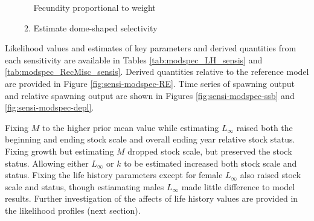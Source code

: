 \documentclass[11pt,
  english,
  a4paper,
]{article}
\begin{document}
\begin{itemize}
\begin{enumerate}

    Fecundity proportional to weight

    \tagmcend\tagstructend\tagstructend

    \tagmcend\tagstructend\tagstructend
  \item


    Estimate dome-shaped selectivity

    \tagmcend\tagstructend\tagstructend

    \tagmcend\tagstructend\tagstructend
  \end{enumerate}

  \tagstructend
\end{itemize}

\tagstructend


Likelihood values and estimates of key parameters and derived quantities from each sensitivity are available in Tables \ref{tab:modspec_LH_sensis} and \ref{tab:modspec_RecMisc_sensis}. Derived quantities relative to the reference model are provided in Figure \ref{fig:sensi-modspec-RE}. Time series of spawning output and relative spawning output are shown in Figures \ref{fig:sensi-modspec-ssb} and \ref{fig:sensi-modspec-depl}.

\leavevmode\tagmcend\tagstructend\par


Fixing {\(M\)\leavevmode\tagmcend\tagstructend} to the higher prior mean value while estimating {\(L_{\infty}\)\leavevmode\tagmcend\tagstructend} raised both the beginning and ending stock scale and overall ending year relative stock status. Fixing growth but estimating {\(M\)\leavevmode\tagmcend\tagstructend} dropped stock scale, but preserved the stock status. Allowing either {\(L_{\infty}\)\leavevmode\tagmcend\tagstructend} or {\(k\)\leavevmode\tagmcend\tagstructend} to be estimated increased both stock scale and status. Fixing the life history parameters except for female {\(L_{\infty}\)\leavevmode\tagmcend\tagstructend} also raised stock scale and status, though estiamating males {\(L_{\infty}\)\leavevmode\tagmcend\tagstructend} made little difference to model results. Further investigation of the affects of life history values are provided in the likelihood profiles (next section).
\end{document}
